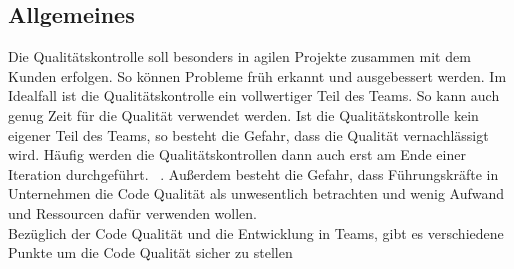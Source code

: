 \subsection{Allgemeines}
Die Qualitätskontrolle soll besonders in agilen Projekte zusammen mit dem Kunden erfolgen. So können Probleme früh erkannt und ausgebessert werden. Im Idealfall ist die Qualitätskontrolle ein vollwertiger Teil des Teams. So kann auch genug Zeit für die Qualität verwendet werden. Ist die Qualitätskontrolle kein eigener Teil des Teams, so besteht die Gefahr, dass die Qualität vernachlässigt wird. Häufig werden die Qualitätskontrollen dann auch erst am Ende einer Iteration durchgeführt. ~\parencite[vgl. 180-182]{ecksteinTeams}. Außerdem besteht die Gefahr, dass Führungskräfte in Unternehmen die Code Qualität als unwesentlich betrachten und wenig Aufwand und Ressourcen dafür verwenden wollen. \\
Bezüglich der Code Qualität und die Entwicklung in Teams, gibt es verschiedene Punkte um die Code Qualität sicher zu stellen ~\parencite{verwijsTeams}
